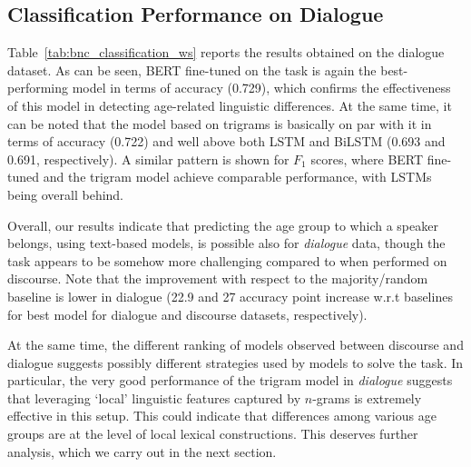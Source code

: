 \subsection{Classification Performance on Dialogue}
Table~\ref{tab:bnc_classification_ws} reports the results obtained on the dialogue dataset. As can be seen, BERT fine-tuned on the task is again the best-performing model in terms of accuracy (0.729), which confirms the effectiveness of this model in detecting age-related linguistic differences. At the same time, it can be noted that the model based on trigrams is basically on par with it in terms of accuracy (0.722) and well above both LSTM and BiLSTM (0.693 and 0.691, respectively). A similar pattern is shown for $F_1$ scores, where BERT fine-tuned and the trigram model achieve comparable performance, with LSTMs being overall behind. 

Overall, our results indicate that predicting the age group to which a speaker belongs, using text-based models, is possible also for \emph{dialogue} data, though the task appears to be somehow more challenging compared to when performed on discourse.
Note that the improvement with respect to the majority/random baseline is lower in dialogue (22.9 and 27 accuracy point increase w.r.t baselines for best model for dialogue and discourse datasets, respectively).

At the same time, the different ranking of models observed between discourse and dialogue suggests possibly different strategies used by models to solve the task. In particular, the very good performance of the trigram model in \emph{dialogue} suggests that leveraging `local' linguistic features captured by $n$-grams is extremely effective in this setup. This could indicate that differences among various age groups are at the level of
local lexical constructions.
This deserves further analysis, which we carry out in the next section.


